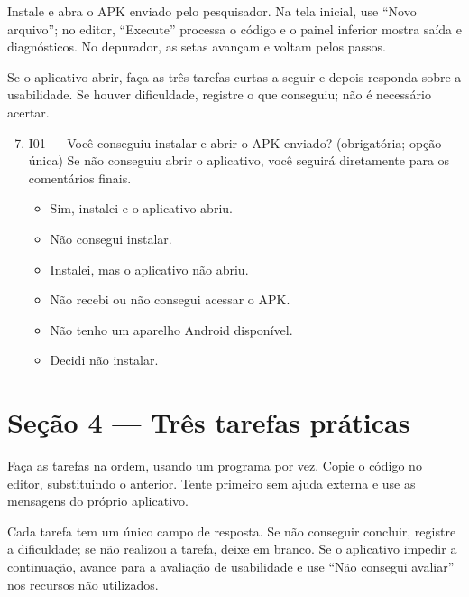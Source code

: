 Instale e abra o APK enviado pelo pesquisador. Na tela inicial, use ``Novo arquivo'';
no editor, ``Execute'' processa o código e o painel inferior mostra saída e
diagnósticos. No depurador, as setas avançam e voltam pelos passos.

Se o aplicativo abrir, faça as três tarefas curtas a seguir e depois responda sobre a
usabilidade. Se houver dificuldade, registre o que conseguiu; não é necessário acertar.

\begin{enumerate}
\setcounter{enumi}{6}
\item I01 --- Você conseguiu instalar e abrir o APK enviado? (obrigatória; opção única)
  Se não conseguiu abrir o aplicativo, você seguirá diretamente para os comentários
  finais.
  \begin{itemize}
    \item Sim, instalei e o aplicativo abriu.
    \item Não consegui instalar.
    \item Instalei, mas o aplicativo não abriu.
    \item Não recebi ou não consegui acessar o APK.
    \item Não tenho um aparelho Android disponível.
    \item Decidi não instalar.
  \end{itemize}
\end{enumerate}

\section*{Seção 4 --- Três tarefas práticas}

Faça as tarefas na ordem, usando um programa por vez. Copie o código no editor,
substituindo o anterior. Tente primeiro sem ajuda externa e use as mensagens do
próprio aplicativo.

Cada tarefa tem um único campo de resposta. Se não conseguir concluir, registre a
dificuldade; se não realizou a tarefa, deixe em branco. Se o aplicativo impedir a
continuação, avance para a avaliação de usabilidade e use ``Não consegui avaliar''
nos recursos não utilizados.

